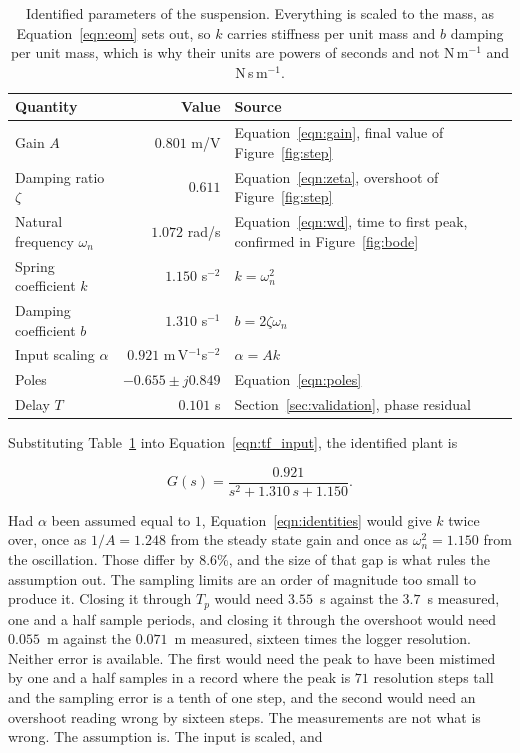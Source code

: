 \begin{table}[h!] \centering \begin{tabular}{lrp{6.2cm}} \toprule \textbf{Quantity} &
\textbf{Value} & \textbf{Source} \\ \midrule Gain $A$ & $0.801$ m/V & Equation~\ref{eqn:gain},
final value of Figure~\ref{fig:step} \\ Damping ratio $\zeta$ & $0.611$ &
Equation~\ref{eqn:zeta}, overshoot of Figure~\ref{fig:step} \\ Natural frequency $\omega_n$ &
$1.072$ rad/s & Equation~\ref{eqn:wd}, time to first peak, confirmed in Figure~\ref{fig:bode}
\\ Spring coefficient $k$ & $1.150$ s$^{-2}$ & $k = \omega_n^2$ \\ Damping coefficient $b$ &
$1.310$ s$^{-1}$ & $b = 2\zeta\omega_n$ \\ Input scaling $\alpha$ & $0.921$ m\,V$^{-1}$s$^{-2}$
& $\alpha = Ak$ \\ Poles & $-0.655 \pm j0.849$ & Equation~\ref{eqn:poles} \\ Delay $T$ &
$0.101$ s & Section~\ref{sec:validation}, phase residual \\ \bottomrule \end{tabular}
\caption{Identified parameters of the suspension. Everything is scaled to the mass, as
Equation~\ref{eqn:eom} sets out, so $k$ carries stiffness per unit mass and $b$ damping per
unit mass, which is why their units are powers of seconds and not N\,m$^{-1}$ and
N\,s\,m$^{-1}$.} \label{tab:model} \end{table}

Substituting Table~\ref{tab:model} into Equation~\ref{eqn:tf_input}, the identified plant is

\begin{equation}\label{eqn:identified}
    G(s) = \frac{0.921}{s^2 + 1.310\,s + 1.150}.
\end{equation}

Had $\alpha$ been assumed equal to $1$, Equation~\ref{eqn:identities} would give $k$ twice
over, once as $1/A = 1.248$ from the steady state gain and once as $\omega_n^2 = 1.150$ from
the oscillation. Those differ by $8.6$\%, and the size of that gap is what rules the assumption
out. The sampling limits are an order of magnitude too small to produce it. Closing it through
$T_p$ would need $3.55$~s against the $3.7$~s measured, one and a half sample periods, and
closing it through the overshoot would need $0.055$~m against the $0.071$~m measured, sixteen
times the logger resolution. Neither error is available. The first would need the peak to have
been mistimed by one and a half samples in a record where the peak is $71$ resolution steps
tall and the sampling error is a tenth of one step, and the second would need an overshoot
reading wrong by sixteen steps. The measurements are not what is wrong. The assumption is. The
input is scaled, and

